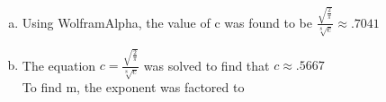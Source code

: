 \documentclass[12pt]{article}
\newenvironment{problem}[2][Problem]{\begin{trivlist}
\item[\hskip \labelsep {\bfseries #1}\hskip \labelsep {\bfseries #2.}]
  \vspace{1 cm}
}{\end{trivlist}}
\begin{document}
\begin{problem}{3.19} %
\item
\end{problem}

\begin{problem}{3.21} %
\item
  \begin{enumerate}[a.]
    \item %
      Using WolframAlpha\textsuperscript{\textregistered}, the value of c was found to be 
      $\frac{\sqrt{\frac{2}{\pi}}}{\sqrt[8]{e}} \approx .7041$
    \item %
      The equation $c = \frac{\sqrt{\frac{2}{\pi}}}{\sqrt[8]{e}}$ was solved to 
      find that $c \approx .5667$ \\ 
      To find m, the exponent was factored to
  \end{enumerate}
\end{problem}

\begin{problem}{3.23} %
\item
\end{problem}
\end{document}
